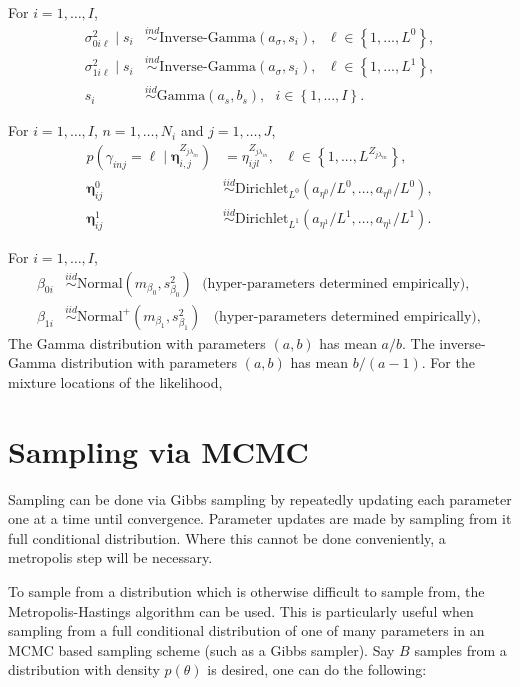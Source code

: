 \documentclass[12pt]{article}
\newcommand{\bc}[1]{ \left\{#1\right\} }
\newcommand{\N}{ \mathcal{N} }
\newcommand{\iid}{\overset{iid}{\sim}}
\newcommand{\ind}{\overset{ind}{\sim}}
\def\N{\text{Normal}}
\def\G{\text{Gamma}}
\def\IG{\text{Inverse-Gamma}}
\def\Dir{\text{Dirichlet}}
\begin{document}
For $i=1, \ldots, I$,
%
\begin{align*}
\sigma^2_{0i\ell} \mid s_i &\ind \IG(a_\sigma, s_i), ~~~ \ell \in \bc{1,...,L^0}, \\
\sigma^2_{1i\ell} \mid s_i &\ind \IG(a_\sigma, s_i), ~~~ \ell \in \bc{1,...,L^1}, \\
s_i &\iid \G(a_s, b_s), ~~~ i \in \bc{1,...,I}.
\end{align*}

For $i=1, \ldots, I$, $n=1, \ldots, N_i$ and $j=1, \ldots, J$,
%
\begin{align*}
p(\gamma_{inj} = \ell \mid \bm\eta^{Z_{j \lambda_{in}}}_{i,j}) &= \eta^{Z_{j \lambda_{in}}}_{ijl},
~~~ \ell \in \bc{1,...,L^{Z_{j \lambda_{in}}}},  \\
\bm\eta^0_{ij} &\iid \Dir_{L^0}(a_{\eta^0}/L^0, \ldots, a_{\eta^0}/L^0), \\
\bm\eta^1_{ij} &\iid \Dir_{L^1}(a_{\eta^1}/L^1, \ldots, a_{\eta^1}/L^1). 
\end{align*}


For $i=1, \ldots, I$,
%
\begin{align*}
\beta_{0i} &\iid \N(m_{\beta_0}, s^2_{\beta_0}) ~~~
\text{(hyper-parameters determined empirically)}, \\
\beta_{1i} &\iid \N^+(m_{\beta_1}, s^2_{\beta_1}) ~~~~
\text{(hyper-parameters determined empirically)}, 
\end{align*}
%
The Gamma distribution with parameters $(a,b)$ has mean $a/b$. The
inverse-Gamma distribution with parameters $(a,b)$ has mean
$b / (a-1)$. For the mixture locations of the likelihood,
%


\section{Sampling via MCMC}\label{sampling-via-mcmc}

Sampling can be done via Gibbs sampling by repeatedly updating each
parameter one at a time until convergence. Parameter updates are made by
sampling from it full conditional distribution. Where this cannot be
done conveniently, a metropolis step will be necessary.

To sample from a distribution which is otherwise difficult to sample
from, the Metropolis-Hastings algorithm can be used. This is
particularly useful when sampling from a full conditional distribution
of one of many parameters in an MCMC based sampling scheme (such as a
Gibbs sampler). Say $B$ samples from a distribution with density
$p(\theta)$ is desired, one can do the following:
\end{document}
